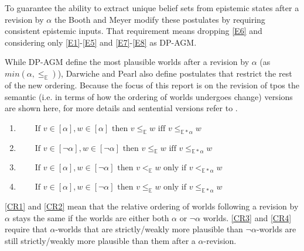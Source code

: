 \documentclass[11pt]{scrartcl}
\theoremstyle{definition}
\begin{document}
To guarantee the ability to extract unique belief sets from epistemic states after a revision by $\alpha$ the Booth and Meyer \cite{Booth2011} modify these postulates by requiring consistent epistemic inputs. That requirement means dropping \ref{E6} and considering only \ref{E1}-\ref{E5} and \ref{E7}-\ref{E8} as DP-AGM.

While DP-AGM define the most plausible worlds after a revision by $\alpha$ (as $min(\alpha, \leq_{\mathbb{E}})$), Darwiche and Pearl also define postulates that restrict the rest of the new ordering. Because the focus of this report is on the revision of tpos the semantic (i.e. in terms of how the ordering of worlds undergoes change) versions are shown here, for more details and sentential versions refer to \cite{Darwiche1997}.

\begin{enumerate}[wide=0pt, widest=99,leftmargin=\parindent,label = (CR$\arabic*$)]
    \item\label{CR1} $\qquad \textrm{If } v\in [\alpha], w \in [\alpha] \textrm{ then } v \leq_{\mathbb{E}} w \textrm{ iff } v \leq_{\mathbb{E\ast\alpha}} w$
    \item\label{CR2} $\qquad \textrm{If } v\in [\neg \alpha], w \in [\neg \alpha] \textrm{ then } v \leq_{\mathbb{E}} w \textrm{ iff } v \leq_{\mathbb{E\ast\alpha}} w$
    \item\label{CR3} $\qquad \textrm{If } v\in [ \alpha], w \in [\neg \alpha] \textrm{ then } v <_{\mathbb{E}} w \textrm{ only if } v <_{\mathbb{E\ast\alpha}} w$
    \item\label{CR4} $\qquad \textrm{If } v\in [ \alpha], w \in [\neg \alpha] \textrm{ then } v \leq_{\mathbb{E}} w \textrm{ only if } v \leq_{\mathbb{E\ast\alpha}} w$
\end{enumerate}

\ref{CR1} and \ref{CR2} mean that the relative ordering of worlds following a revision by $\alpha$ stays the same if the worlds are either both $\alpha$ or $\neg\alpha$ worlds. \ref{CR3} and \ref{CR4} require that $\alpha$-worlds that are strictly/weakly more plausible than $\neg\alpha$-worlds are still strictly/weakly more plausible than them after a $\alpha$-revision.

\end{document}
